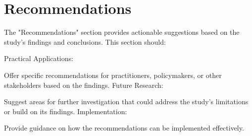 {\section{Recommendations}

The "Recommendations" section provides actionable suggestions based on the study's findings and conclusions. This section should:

Practical Applications:

Offer specific recommendations for practitioners, policymakers, or other stakeholders based on the findings.
Future Research:

Suggest areas for further investigation that could address the study’s limitations or build on its findings.
Implementation:

Provide guidance on how the recommendations can be implemented effectively.

}